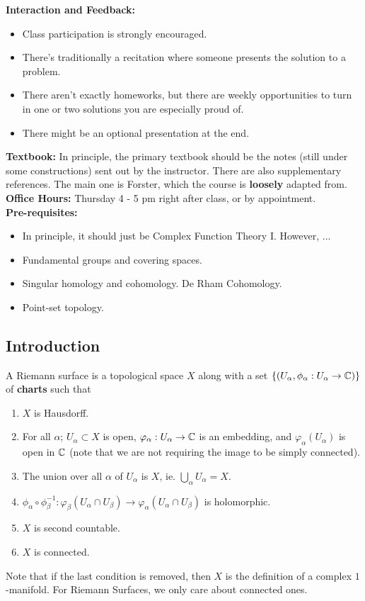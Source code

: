 \documentclass{article}
\begin{document}
\textbf{Interaction and Feedback:}
\begin{itemize}
    \item Class participation is strongly encouraged.
    \item There's traditionally a recitation where someone presents the solution to a problem.
    \item There aren't exactly homeworks, but there are weekly opportunities to turn in one or two solutions you are especially proud of.
    \item There might be an optional presentation at the end.
\end{itemize}

\textbf{Textbook: } In principle, the primary textbook should be the notes (still under some constructions) sent out by the instructor. There are also supplementary references. The main one is Forster, which the course is \textbf{loosely} adapted from.\\

\textbf{Office Hours: } Thursday 4 - 5 pm right after class, or by appointment.\\

\textbf{Pre-requisites:}
\begin{itemize}
    \item In principle, it should just be Complex Function Theory I. However, ...
    \item Fundamental groups and covering spaces.
    \item Singular homology and cohomology. De Rham Cohomology.
    \item Point-set topology.
\end{itemize}

\subsection{Introduction}

\begin{definition}
    A Riemann surface is a topological space $X$ along with a set $\{(U_\alpha, \phi_\alpha: U_\alpha \to \mathbb{C})\}$ of \textbf{charts} such that
    \begin{enumerate}
        \item $X$ is Hausdorff.
        \item For all $\alpha$; $U_\alpha \subset X$ is open, $\varphi_\alpha: U_\alpha \to \mathbb{C}$ is an embedding, and $\varphi_\alpha(U_\alpha)$ is open in $\mathbb{C}$ (note that we are not requiring the image to be simply connected).
        \item The union over all $\alpha$ of $U_\alpha$ is $X$, ie. $\bigcup_{\alpha} U_\alpha = X$.
        \item $\phi_\alpha \circ \phi_\beta^{-1}: \varphi_\beta(U_\alpha \cap U_\beta) \to \varphi_\alpha(U_\alpha \cap U_\beta)$ is holomorphic.
        \item $X$ is second countable.
        \item $X$ is connected.
    \end{enumerate}
    Note that if the last condition is removed, then $X$ is the definition of a complex $1$-manifold. For Riemann Surfaces, we only care about connected ones.
\end{definition}
\end{document}
